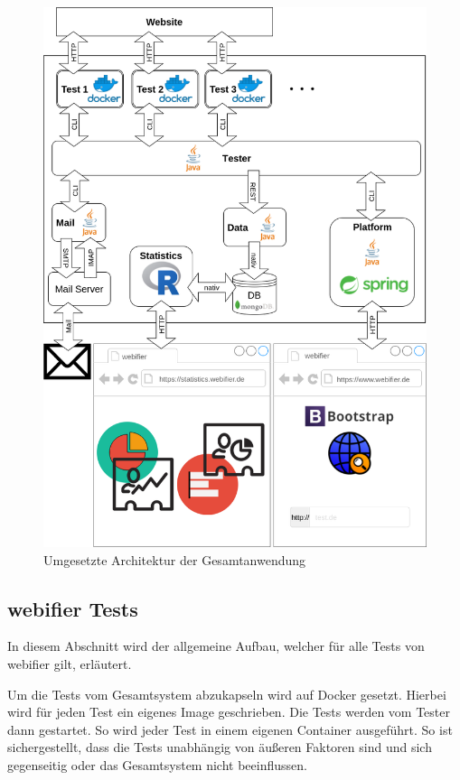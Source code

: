 \begin{figure}[H]
	\centering
	\includegraphics[width=\textwidth]{images/anwendung-umsetzung}
	\caption{Umgesetzte Architektur der Gesamtanwendung}
	\label{fig:anwendung-umsetzung}
\end{figure}

\subsection{webifier Tests}
In diesem Abschnitt wird der allgemeine Aufbau, welcher für alle Tests von webifier gilt, erläutert.

Um die Tests vom Gesamtsystem abzukapseln wird auf Docker gesetzt. Hierbei wird für jeden Test ein eigenes Image geschrieben. Die Tests werden vom Tester dann gestartet. So wird jeder Test in einem eigenen Container ausgeführt. So ist sichergestellt, dass die Tests unabhängig von äußeren Faktoren sind und sich gegenseitig oder das Gesamtsystem nicht beeinflussen.

